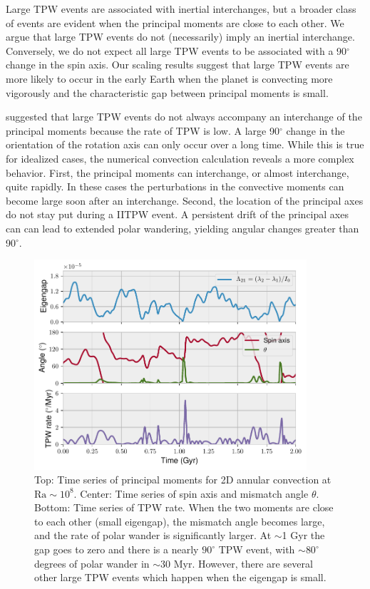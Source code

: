 \documentclass[preprint,12pt,authoryear]{elsarticle}
\begin{document}
Large TPW events are associated with inertial interchanges, but a broader class of events are evident
when the principal moments are close to each other. We argue that large TPW events do not (necessarily) imply an inertial interchange. Conversely, we do not expect all large TPW events to be associated with a 90$^{\circ}$ change in the spin axis. Our scaling results suggest that large TPW events are more likely to occur in the early Earth when the planet is convecting more vigorously and the characteristic gap between principal moments is small.


\citet{tsai2007theoretical} suggested that large TPW events do not always accompany an interchange of the principal moments because the rate of TPW is low. A large 90$^{\circ}$ change in the orientation of the rotation axis can only occur over a long time.  While
this is true for idealized cases, the numerical convection calculation reveals a more complex behavior. 
First, the principal moments can interchange, or almost interchange, quite rapidly. In these cases  the perturbations in the convective moments can become large soon after an interchange.
Second, the location of the principal axes do not stay put during a IITPW event. A persistent drift of the principal axes can can lead to extended polar wandering, yielding angular changes greater than 90$^\circ$.

\begin{figure}
\centering
\includegraphics[width=0.9\textwidth]{figures/misfit.pdf}
\caption{Top: Time series of principal moments for 2D annular convection at $\mathrm{Ra}\sim10^8$.  Center: Time series of spin axis and mismatch angle $\theta$.  Bottom: Time series of TPW rate. When the two moments are close to each other (small eigengap), the mismatch angle becomes large, and the rate of polar wander is significantly larger. At $\sim$1 Gyr the gap goes to zero and there is a nearly $90^\circ$ TPW event, with $\sim80^\circ$ degrees of polar wander in $\sim$30 Myr. However, there are several other large TPW events which happen when the eigengap is small.}
\label{fig:misfit}
\end{figure}
\end{document}

